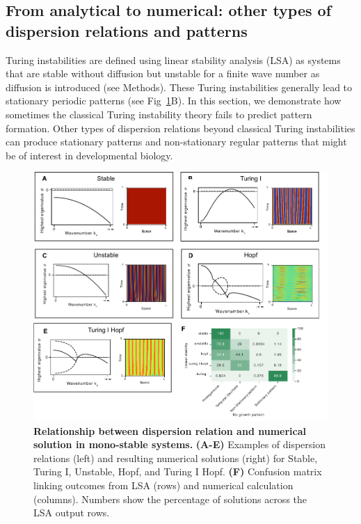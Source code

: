 \documentclass[10pt,letterpaper]{article}
\begin{document}
\subsection*{From analytical to numerical: other types of dispersion relations and patterns} \label{nogrowth}

Turing instabilities are defined using linear stability analysis (LSA) as systems that are stable without diffusion but unstable for a finite wave number as diffusion is introduced (see Methods). These Turing instabilities generally lead to stationary periodic patterns (see Fig~\ref{fig:dispersions}B). In this section, we demonstrate how sometimes the classical Turing instability theory fails to predict pattern formation.
Other types of dispersion relations beyond classical Turing instabilities can produce stationary patterns and non-stationary regular patterns that might be of interest in developmental biology.


\begin{figure}[bp!]
    \includegraphics[width=1\textwidth]{figures/dispersion} %
    \caption{\textbf{Relationship between dispersion relation and numerical solution in mono-stable systems.} \textbf{(A-E)} Examples of dispersion relations (left) and resulting numerical solutions (right) for Stable, Turing I, Unstable, Hopf, and Turing I Hopf. \textbf{(F)} Confusion matrix linking outcomes from LSA (rows) and numerical calculation (columns). Numbers show the percentage of solutions across the LSA output rows.}
    \label{fig:dispersions} %
\end{figure}
\end{document}
